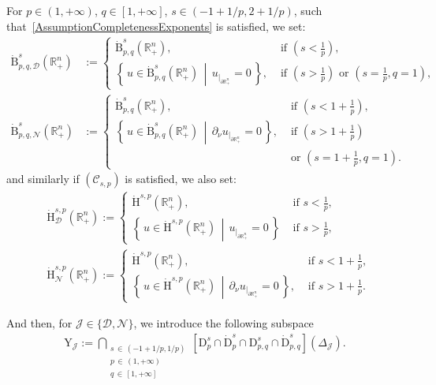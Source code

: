 \documentclass[AHL,Unicode,longabstracts,published]{cedram}
\newcommand{\bbR}{\mathbb{R}}
\newcommand{\rmH}{\mathrm{H}}%
\newcommand{\rmB}{\mathrm{B}}
\newcommand{\rmD}{\mathrm{D}}
\newcommand{\rmY}{\mathrm{Y}}
\newcommand{\clC}{\mathcal{C}}
\newcommand{\clN}{\mathcal{N}}
\newcommand{\clJ}{\mathcal{J}}
\newcommand{\clD}{\mathcal{D}}
\begin{document}
For $p\in(1,+\infty)$, $q\in[1,+\infty]$, $s\in(-1+1/p,2+1/p)$, such that~\eqref{AssumptionCompletenessExponents} is satisfied, we set:
\begin{align*}
\dot{\rmB}^{s}_{p,q,\clD}\left(\bbR^n_+\right) &{:=}
\begin{cases} \dot{\rmB}^{s}_{p,q}\left(\bbR^n_+\right), &\text{ if } \left(s < \frac{1}{p}\right),\\
\left\{ \,u\in \dot{\rmB}^{s}_{p,q}\left(\bbR^n_+\right)\, \middle|\, u_{|_{\partial\bbR^n_+}}=0 \,\right\},
&\text{ if } \left(s > \frac{1}{p}\right) \text{ or } 
\left(s = \frac{1}{p}, q=1\right),
\end{cases}\\
\dot{\rmB}^{s}_{p,q,\clN}\left(\bbR^n_+\right) &{:=}
\begin{cases} 
\dot{\rmB}^{s}_{p,q}\left(\bbR^n_+\right), &\text{ if } \left(s < 1+ \frac{1}{p}\right), \\
\left\{ \,u\in \dot{\rmB}^{s}_{p,q}\left(\bbR^n_+\right)\, \middle|\, \partial_{\nu}u_{|_{\partial\bbR^n_+}}=0\,\right\},
&\text{ if }\left(s >1+ \frac{1}{p}\right)\\ &\text{ or }\left(s = 1+\frac{1}{p}, q=1\right).
\end{cases}
\end{align*}
and similarly if $(\clC_{s,p})$ is satisfied, we also set:
\begin{align*}
&\dot{\rmH}^{s,p}_{\clD}\left(\bbR^n_+\right):=
\begin{cases} \dot{\rmH}^{s,p}\left(\bbR^n_+\right),
&\text{ if } s < \frac{1}{p},\\
\left\{ \,u\in \dot{\rmH}^{s,p}\left(\bbR^n_+\right)\, \middle|\, u_{|_{\partial\bbR^n_+}}=0 \,\right\} &\text{ if }s > \frac{1}{p},
\end{cases}\\
&\dot{\rmH}^{s,p}_{\clN}\left(\bbR^n_+\right):=
\begin{cases} \dot{\rmH}^{s,p}\left(\bbR^n_+\right), &\text{ if } s < 1+ \frac{1}{p},\\
\left\{ \,u\in \dot{\rmH}^{s,p}\left(\bbR^n_+\right)\, \middle|\, \partial_{\nu}u_{|_{\partial\bbR^n_+}}=0\,\right\}, &\text{ if }s >1+ \frac{1}{p}.
\end{cases}
\end{align*}

And then, for $\clJ\in\{\clD,\clN\}$, we introduce the following subspace
\begin{align*}
\rmY_{\clJ}:= \bigcap_{\substack{s\,\in\,\left(-1+1/p,1/p\right) \\
p\,\in\,(1,+\infty)\\
q\,\in\,[1,+\infty]}} \left[{\rmD}^{s}_{p}\cap\dot{\rmD}^{s}_{p}\cap{\rmD}^{s}_{p,q}\cap\dot{\rmD}^{s}_{p,q}\right]({{\Delta}}_{\clJ}) .
\end{align*}
\end{document}
